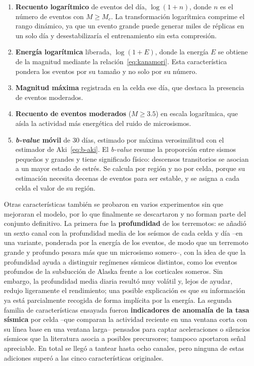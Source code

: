 \begin{enumerate}
  \item \textbf{Recuento logarítmico} de eventos del día, \(\log(1+n)\), donde \(n\) es el
        número de eventos con \(M \geq M_c\). La transformación logarítmica comprime el
        rango dinámico, ya que un evento grande puede generar miles de réplicas en un solo
        día y desestabilizaría el entrenamiento sin esta compresión.
  \item \textbf{Energía logarítmica} liberada, \(\log(1+E)\), donde la energía \(E\) se
        obtiene de la magnitud mediante la relación~\eqref{eq:kanamori}. Esta característica
        pondera los eventos por su tamaño y no solo por su número.
  \item \textbf{Magnitud máxima} registrada en la celda ese día, que destaca la presencia de
        eventos moderados.
  \item \textbf{Recuento de eventos moderados} (\(M \geq 3.5\)) en escala logarítmica, que
        aísla la actividad más energética del ruido de microsismos.
  \item \textbf{\textit{b-value} móvil} de 30 días, estimado por máxima verosimilitud con el
        estimador de Aki~\eqref{eq:b-aki}. El \textit{b-value} resume la proporción entre
        sismos pequeños y grandes y tiene significado físico: descensos transitorios se
        asocian a un mayor estado de estrés. Se calcula por región y no por celda, porque su
        estimación necesita decenas de eventos para ser estable, y se asigna a cada celda el
        valor de su región.
\end{enumerate}

Otras características también se probaron en varios experimentos sin que mejoraran el modelo,
por lo que finalmente se descartaron y no forman parte del conjunto definitivo. La primera fue
la \textbf{profundidad} de los terremotos: se añadió un sexto canal con la profundidad media de
los seísmos de cada celda y día --en una variante, ponderada por la energía de los eventos, de
modo que un terremoto grande y profundo pesara más que un microsismo somero--, con la idea de
que la profundidad ayuda a distinguir regímenes sísmicos distintos, como los eventos profundos
de la subducción de Alaska frente a los corticales someros. Sin embargo, la profundidad media
diaria resultó muy volátil y, lejos de ayudar, redujo ligeramente el rendimiento; una posible
explicación es que su información ya está parcialmente recogida de forma implícita por la
energía. La segunda familia de características ensayada fueron \textbf{indicadores de anomalía
  de la tasa sísmica} por celda --que comparan la actividad reciente en una ventana corta con su
línea base en una ventana larga-- pensados para captar aceleraciones o silencios sísmicos que
la literatura asocia a posibles precursores; tampoco aportaron señal apreciable. En total se
llegó a tantear hasta ocho canales, pero ninguna de estas adiciones superó a las cinco
características originales.

